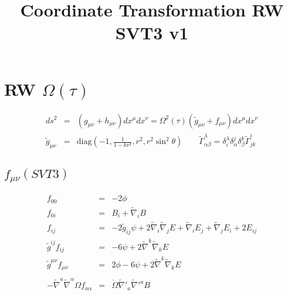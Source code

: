 \documentclass[10pt,letterpaper]{article}
\title{Coordinate Transformation RW SVT3 v1}
\date{}
\numberwithin{equation}{section}
\begin{document}
 
\maketitle
\noindent 
\section{RW $\Omega(\tau)$}
\begin{eqnarray}
ds^2 &=& (g_{\mu\nu} + h_{\mu\nu})dx^\mu dx^\nu = \Omega^2(\tau)(\tilde g_{\mu\nu} + f_{\mu\nu})dx^\mu dx^\nu
\\
\tilde g_{\mu\nu} &=& \text{diag}\left(-1,\frac{1}{1-kr^2},r^2,r^2\sin^2\theta\right)\qquad \tilde \Gamma^{\lambda}_{\alpha\beta} = \delta^\lambda_i \delta^j_\alpha \delta^k_\beta \tilde \Gamma^{i}_{jk}
\end{eqnarray}
%
\subsection{$f_{\mu\nu}(SVT3)$}
\begin{eqnarray}
f_{00} &=& -2\phi
\nonumber\\
f_{0i} &=& B_i + \tilde\nabla_i B
\nonumber\\
f_{ij} &=& -2\tilde g_{ij} \psi + 2\tilde\nabla_i\tilde\nabla_j E + \tilde\nabla_i E_j + \tilde\nabla_j E_i + 2E_{ij}
\nonumber\\
\tilde g^{ij} f_{ij} &=& -6\psi + 2\tilde\nabla^k\tilde\nabla_k E
\nonumber\\
\tilde g^{\mu\nu} f_{\mu\nu} &=& 2\phi-6\psi + 2\tilde\nabla^k\tilde\nabla_k E
\\ \nonumber\\
-\tilde\nabla^a \tilde\nabla^\alpha \Omega f_{a\alpha} &=& \dot\Omega \tilde\nabla'_a\tilde\nabla'^a B
\end{eqnarray}
%
\end{document}
